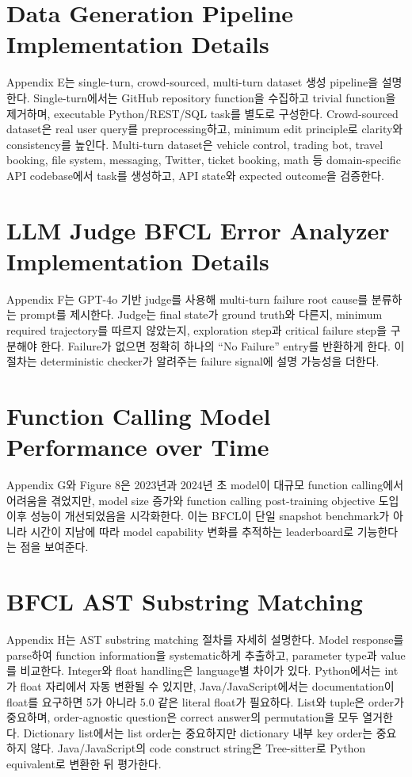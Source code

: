 \documentclass[11pt]{article}
\begin{document}
\section{Data Generation Pipeline Implementation Details}
Appendix E는 single-turn, crowd-sourced, multi-turn dataset 생성 pipeline을 설명한다. Single-turn에서는 GitHub repository function을 수집하고 trivial function을 제거하며, executable Python/REST/SQL task를 별도로 구성한다. Crowd-sourced dataset은 real user query를 preprocessing하고, minimum edit principle로 clarity와 consistency를 높인다. Multi-turn dataset은 vehicle control, trading bot, travel booking, file system, messaging, Twitter, ticket booking, math 등 domain-specific API codebase에서 task를 생성하고, API state와 expected outcome을 검증한다.

\section{LLM Judge BFCL Error Analyzer Implementation Details}
Appendix F는 GPT-4o 기반 judge를 사용해 multi-turn failure root cause를 분류하는 prompt를 제시한다. Judge는 final state가 ground truth와 다른지, minimum required trajectory를 따르지 않았는지, exploration step과 critical failure step을 구분해야 한다. Failure가 없으면 정확히 하나의 ``No Failure'' entry를 반환하게 한다. 이 절차는 deterministic checker가 알려주는 failure signal에 설명 가능성을 더한다.

\section{Function Calling Model Performance over Time}
Appendix G와 Figure 8은 2023년과 2024년 초 model이 대규모 function calling에서 어려움을 겪었지만, model size 증가와 function calling post-training objective 도입 이후 성능이 개선되었음을 시각화한다. 이는 BFCL이 단일 snapshot benchmark가 아니라 시간이 지남에 따라 model capability 변화를 추적하는 leaderboard로 기능한다는 점을 보여준다.

\section{BFCL AST Substring Matching}
Appendix H는 AST substring matching 절차를 자세히 설명한다. Model response를 parse하여 function information을 systematic하게 추출하고, parameter type과 value를 비교한다. Integer와 float handling은 language별 차이가 있다. Python에서는 int가 float 자리에서 자동 변환될 수 있지만, Java/JavaScript에서는 documentation이 float를 요구하면 5가 아니라 5.0 같은 literal float가 필요하다. List와 tuple은 order가 중요하며, order-agnostic question은 correct answer의 permutation을 모두 열거한다. Dictionary list에서는 list order는 중요하지만 dictionary 내부 key order는 중요하지 않다. Java/JavaScript의 code construct string은 Tree-sitter로 Python equivalent로 변환한 뒤 평가한다.
\end{document}
